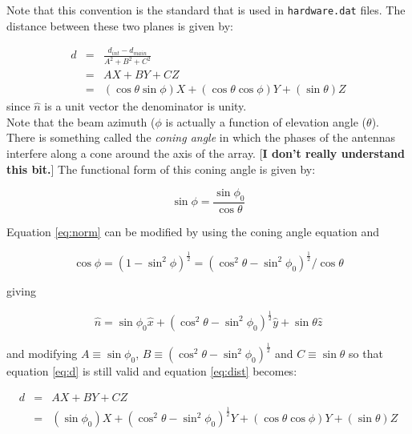 \documentclass{article}
\begin{document}
\noindent
Note that this convention is the standard that is used in {\tt hardware.dat}
files. The distance between these two planes is given by:

\begin{eqnarray}
d & = & \frac{d_{int} - d_{main}}{A^2 + B^2 + C^2} \\
  & = & AX + BY + CZ \label{eq:d} \\
  & = & \left( \cos \theta \sin \phi \right) X +
          \left( \cos \theta \cos \phi \right) Y +
          \left( \sin \theta \right) Z \label{eq:dist}
\end{eqnarray}
since $\hat{n}$ is a unit vector the denominator is unity. \\

\noindent
Note that the beam azimuth ($\phi$ is actually a function of elevation
angle ($\theta$). There is something called the {\it coning angle} in
which the phases of the antennas interfere along a cone around the axis
of the array. [{\bf I don't really understand this bit.}] The functional
form of this coning angle is given by:

\begin{equation}
\sin \phi = \frac{\sin \phi_0}{\cos \theta}
\end{equation}

\noindent
Equation \ref{eq:norm} can be modified by using the coning angle equation
and

\begin{equation}
\cos \phi = \left(1 - \sin^2 \phi \right)^{\frac{1}{2}} =
\left(\cos^2 \theta - \sin^2 \phi_0 \right)^{\frac{1}{2}} / \cos \theta
\end{equation}

\noindent
giving

\begin{equation}
\hat{n} = \sin \phi_0 \hat{x} +
          \left(\cos^2 \theta - \sin^2 \phi_0 \right)^{\frac{1}{2}} \hat{y} +
          \sin \theta \hat{z}
\end{equation}

\noindent
and modifying $A \equiv \sin \phi_0$,
$B \equiv \left(\cos^2 \theta - \sin^2 \phi_0 \right)^{\frac{1}{2}}$ and 
$C \equiv \sin \theta$ so that equation \ref{eq:d} is still valid and
equation \ref{eq:dist} becomes:

\begin{eqnarray}
d & = & AX + BY + CZ \\
  & = & \left( \sin \phi_0 \right) X +
        \left(\cos^2 \theta - \sin^2 \phi_0 \right)^{\frac{1}{2}} Y +
          \left( \cos \theta \cos \phi \right) Y +
          \left( \sin \theta \right) Z \label{eq:the_dist}
\end{eqnarray}
\end{document}
